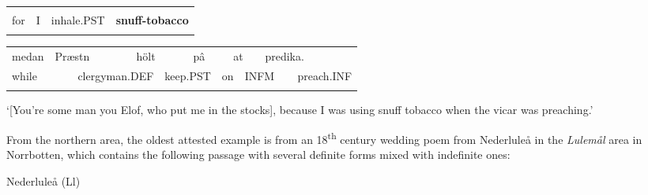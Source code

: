 \begin{tabular}{llll}
\lsptoprule
\multicolumn{4}{l}{för

}\\
for & I & inhale.PST & {\bfseries snuff-tobacco}\\
\lspbottomrule
\end{tabular}

\begin{tabular}{llllllllllll}
\lsptoprule
medan & \multicolumn{2}{l}{Præstn

} & \multicolumn{2}{l}{hölt

} & \multicolumn{2}{l}{pâ

} & \multicolumn{2}{l}{at

} & \multicolumn{2}{l}{predika.

} & \\
\multicolumn{2}{l}{while

} & \multicolumn{2}{l}{clergyman.DEF

} & \multicolumn{2}{l}{keep.PST

} & \multicolumn{2}{l}{on 

} & \multicolumn{2}{l}{INFM

} & \multicolumn{2}{l}{preach.INF

}\\
\lspbottomrule
\end{tabular}

\begin{styleTranslation}
 ‘[You’re some man you Elof, who put me in the stocks], because I was using snuff tobacco when the vicar was preaching.’

\end{styleTranslation}

\begin{styleBodyTextFirst}
From the northern area, the oldest attested example is from an 18\textsuperscript{th} century wedding poem from Nederluleå in the \textit{Lulemål} area in Norrbotten, which contains the following passage with several definite forms mixed with indefinite ones:

\end{styleBodyTextFirst}


\begin{listWWNumileveli}
\item {}

\begin{styleExample}
Nederluleå (Ll)

\end{styleExample}

\end{listWWNumileveli}

